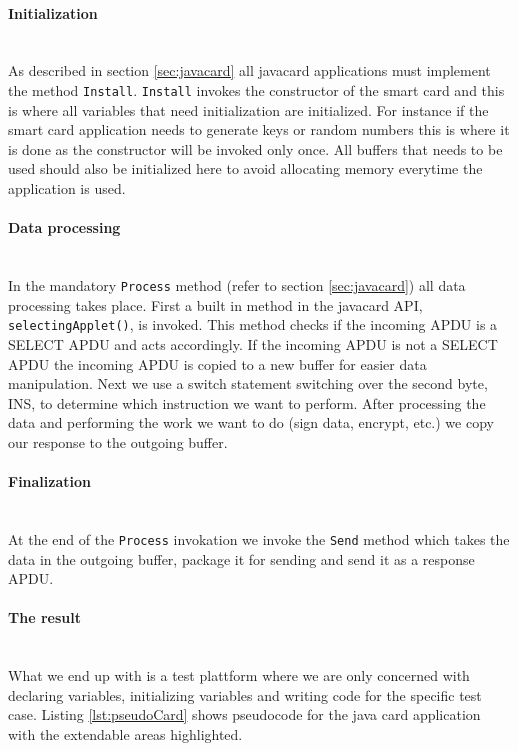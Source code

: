 \paragraph{Initialization}\mbox{}\\
As described in section \ref{sec:javacard} all javacard applications must implement the method \texttt{Install}. \texttt{Install} invokes the constructor of the smart card and this is where all variables that need initialization are initialized. For instance if the smart card application needs to generate keys or random numbers this is where it is done as the constructor will be invoked only once. All buffers that needs to be used should also be initialized here to avoid allocating memory everytime the application is used.

\paragraph{Data processing}\mbox{}\\
In the mandatory \texttt{Process} method (refer to section \ref{sec:javacard}) all data processing takes place. First a built in method in the javacard API, \texttt{selectingApplet()}, is invoked. This method checks if the incoming APDU is a SELECT APDU and acts accordingly. If the incoming APDU is not a SELECT APDU the incoming APDU is copied to a new buffer for easier data manipulation. Next we use a switch statement switching over the second byte, INS, to determine which instruction we want to perform. After processing the data and performing the work we want to do (sign data, encrypt, etc.) we copy our response to the outgoing buffer.

\paragraph{Finalization}\mbox{}\\
At the end of the \texttt{Process} invokation we invoke the \texttt{Send} method which takes the data in the outgoing buffer, package it for sending and send it as a response APDU.

\paragraph{The result}\mbox{}\\
What we end up with is a test plattform where we are only concerned with declaring variables, initializing variables and writing code for the specific test case. Listing \ref{lst:pseudoCard} shows pseudocode for the java card application with the extendable areas highlighted.


